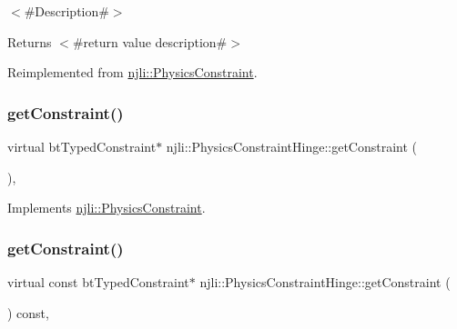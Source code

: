 $<$\#\+Description\#$>$

\begin{DoxyReturn}{Returns}
$<$\#return value description\#$>$ 
\end{DoxyReturn}


Reimplemented from \mbox{\hyperlink{classnjli_1_1_physics_constraint_a4d31c5267199972942d66b3480374010}{njli\+::\+Physics\+Constraint}}.

\mbox{\label{classnjli_1_1_physics_constraint_hinge_a0e6fd626089d0df9061f58e05bf81cdc}} 
\subsubsection{\texorpdfstring{get\+Constraint()}{getConstraint()}\hspace{0.1cm}{\footnotesize\ttfamily [1/2]}}
{\footnotesize\ttfamily virtual bt\+Typed\+Constraint$\ast$ njli\+::\+Physics\+Constraint\+Hinge\+::get\+Constraint (\begin{DoxyParamCaption}{ }\end{DoxyParamCaption})\hspace{0.3cm}{\ttfamily [protected]}, {\ttfamily [virtual]}}



Implements \mbox{\hyperlink{classnjli_1_1_physics_constraint_a0a22d54c2c896af49fa57db9be76a5da}{njli\+::\+Physics\+Constraint}}.

\mbox{\label{classnjli_1_1_physics_constraint_hinge_abc19706f99699a8af8178058c8d80822}} 
\subsubsection{\texorpdfstring{get\+Constraint()}{getConstraint()}\hspace{0.1cm}{\footnotesize\ttfamily [2/2]}}
{\footnotesize\ttfamily virtual const bt\+Typed\+Constraint$\ast$ njli\+::\+Physics\+Constraint\+Hinge\+::get\+Constraint (\begin{DoxyParamCaption}{ }\end{DoxyParamCaption}) const\hspace{0.3cm}{\ttfamily [protected]}, {\ttfamily [virtual]}}



